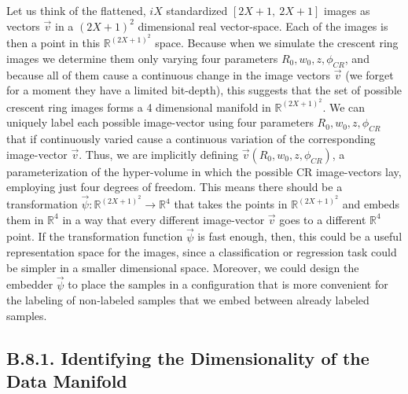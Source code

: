 \documentclass[11pt, a4paper, twoside]{article} %
\newcommand{\R}{\mathbb{R}} %
\begin{document}
Let us think of the flattened, $iX$ standardized $[2X+1,\ 2X+1]$ images as vectors $\vec{v}$ in a $(2X+1)^2$ dimensional real vector-space. Each of the images is then a point in this $\R^{(2X+1)^2}$ space. Because when we simulate the crescent ring images we determine them only varying four parameters $R_0,w_0,z,\phi_{CR}$, and because all of them cause a continuous change in the image vectors $\vec{v}$ (we forget for a moment they have a limited bit-depth), this suggests that the set of possible crescent ring images forms a 4 dimensional manifold in $\R^{(2X+1)^2}$. We can uniquely label each possible image-vector using four parameters $R_0,w_0,z,\phi_{CR}$ that if continuously varied cause a continuous variation of the corresponding image-vector $\vec{v}$. Thus, we are implicitly defining $\vec{v}(R_0,w_0,z,\phi_{CR})$, a parameterization of the hyper-volume in which the possible CR image-vectors lay, employing just four degrees of freedom. This means there should be a transformation $\vec{\psi}:\R^{(2X+1)^2}\rightarrow\R^4$ that takes the points in $\R^{(2X+1)^2}$ and embeds them in $\R^4$ in a way that every different image-vector $\vec{v}$ goes to a different $\R^4$ point. If the transformation function $\vec{\psi}$ is fast enough, then, this could be a useful representation space for the images, since a classification or regression task could be simpler in a smaller dimensional space. Moreover, we could design the embedder $\vec{\psi}$ to place the samples in a configuration that is more convenient for the labeling of non-labeled samples that we embed between already labeled samples.\vspace{-0.3cm}


\subsection*{B.8.1. Identifying the Dimensionality of the Data Manifold}\vspace{-0.1cm}
\end{document}
